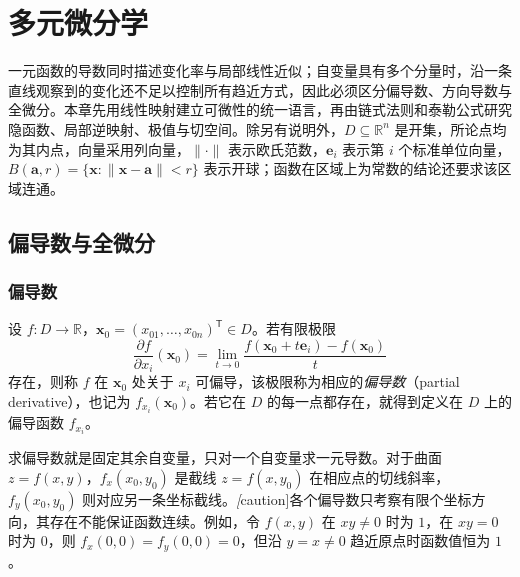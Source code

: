 \setcounter{chapter}{13} %
\chapter{多元微分学}
\label{chap:multivariable-differential-calculus}

一元函数的导数同时描述变化率与局部线性近似；自变量具有多个分量时，沿一条直线观察到的变化还不足以控制所有趋近方式，因此必须区分偏导数、方向导数与全微分。本章先用线性映射建立可微性的统一语言，再由链式法则和泰勒公式研究隐函数、局部逆映射、极值与切空间。除另有说明外，$D\subseteq\mathbb R^n$ 是开集，所论点均为其内点，向量采用列向量，$\|\cdot\|$ 表示欧氏范数，$\boldsymbol e_i$ 表示第 $i$ 个标准单位向量，$B(\boldsymbol a,r)=\{\boldsymbol x:\|\boldsymbol x-\boldsymbol a\|<r\}$ 表示开球；函数在区域上为常数的结论还要求该区域连通。

\section{偏导数与全微分}
\label{sec:partial-derivatives-and-total-differentials}


\subsection{偏导数}
\label{subsec:partial-derivatives}

\begin{definition}
\label{def:multivariable-partial-derivative}
设 $f:D\to\mathbb R$，$\boldsymbol x_0=(x_{01},\ldots,x_{0n})^{\mathsf T}\in D$。若有限极限
\[
    \frac{\partial f}{\partial x_i}(\boldsymbol x_0)
    =\lim_{t\to0}\frac{f(\boldsymbol x_0+t\boldsymbol e_i)-f(\boldsymbol x_0)}{t}
\]
存在，则称 $f$ 在 $\boldsymbol x_0$ 处关于 $x_i$ 可偏导，该极限称为相应的\emph{偏导数}（partial derivative），也记为 $f_{x_i}(\boldsymbol x_0)$。若它在 $D$ 的每一点都存在，就得到定义在 $D$ 上的偏导函数 $f_{x_i}$。
\end{definition}

求偏导数就是固定其余自变量，只对一个自变量求一元导数。对于曲面 $z=f(x,y)$，$f_x(x_0,y_0)$ 是截线 $z=f(x,y_0)$ 在相应点的切线斜率，$f_y(x_0,y_0)$ 则对应另一条坐标截线。\emph[caution]{各个偏导数只考察有限个坐标方向，其存在不能保证函数连续。}例如，令 $f(x,y)$ 在 $xy\ne0$ 时为 $1$，在 $xy=0$ 时为 $0$，则 $f_x(0,0)=f_y(0,0)=0$，但沿 $y=x\ne0$ 趋近原点时函数值恒为 $1$。

